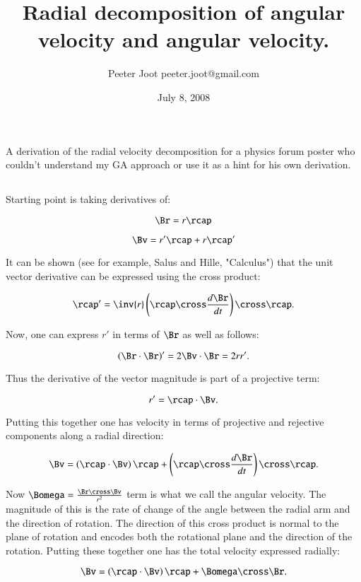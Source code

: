 \documentclass{article}      %
\title{ Radial decomposition of angular velocity and angular velocity.}
\author{Peeter Joot \quad peeter.joot@gmail.com}
\date{July 8, 2008}
\begin{document}

\maketitle{}

\section{}

A derivation of the radial velocity decomposition for a physics forum 
poster who couldn't understand my GA approach or use it as a hint for his
own derivation.

\subsection{}

Starting point is taking derivatives of:

\[
\Br = r \rcap
\]

\[
\Bv = r' \rcap + r \rcap'
\]

It can be shown (see for example, Salus and Hille, "Calculus") that the unit vector derivative can be expressed using the cross product:

\[
\rcap' = \inv{r} \left(\rcap \cross \frac{d\Br}{dt}\right) \cross \rcap.
\]

Now, one can express $r'$ in terms of $\Br$ as well as follows:

\[
\left(\Br \cdot \Br\right)' = 2 \Bv \cdot \Br = 2 r r'.
\]

Thus the derivative of the vector magnitude is part of a projective term:

\[
r' = \rcap \cdot \Bv.
\]

Putting this together one has velocity in terms of projective and rejective
components along a radial direction:

\[
\Bv = \left(\rcap \cdot \Bv\right) \rcap + \left(\rcap \cross \frac{d\Br}{dt}\right) \cross \rcap.
\]

Now $\Bomega = \frac{\Br \cross \Bv}{r^2}$ term is what we call the angular velocity.  The magnitude of this
is the rate of change of the angle between the radial arm and the direction of rotation.  The direction of this
cross product is normal to the plane of rotation and encodes both the rotational plane and the direction of the
rotation.  Putting these together one has the total velocity expressed radially:

\[
\Bv = \left(\rcap \cdot \Bv\right) \rcap + \Bomega \cross \Br.
\]
\end{document}
